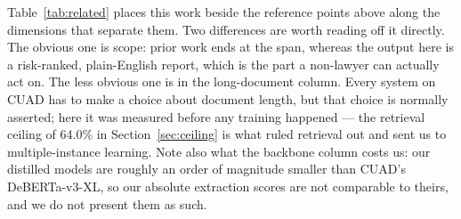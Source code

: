 Table~\ref{tab:related} places this work beside the reference points above along the dimensions that separate them. Two differences are worth reading off it directly. The obvious one is scope: prior work ends at the span, whereas the output here is a risk-ranked, plain-English report, which is the part a non-lawyer can actually act on. The less obvious one is in the long-document column. Every system on CUAD has to make a choice about document length, but that choice is normally asserted; here it was measured before any training happened --- the retrieval ceiling of 64.0\% in Section~\ref{sec:ceiling} is what ruled retrieval out and sent us to multiple-instance learning. Note also what the backbone column costs us: our distilled models are roughly an order of magnitude smaller than CUAD's DeBERTa-v3-XL, so our absolute extraction scores are not comparable to theirs, and we do not present them as such.

